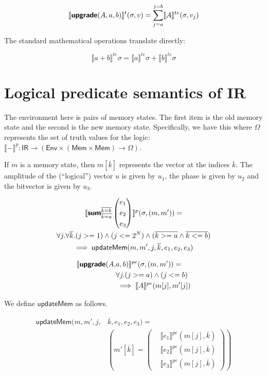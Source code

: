 \documentclass[runningheads]{llncs}
\newcommand {\ra} {\rightarrow}
\newcommand {\Env} {\textsf{Env}}
\newcommand {\sem} [1] {\llbracket #1 \rrbracket}
\newcommand {\Psem} [1] {\sem{#1}^p}
\newcommand {\PsemE} [1] {\sem{#1}^{pe}}
\newcommand {\Tsem} [1] {\sem{#1}^t}
\newcommand {\TsemE} [1] {\sem{#1}^{te}}
\newcommand {\Mem} {\textsf{Mem}}
\newcommand {\ir} [1] {\textsf{\textbf{#1}}}
\newcommand {\IRep} {\textsf{IR}}
\newcommand {\irUpgrade} {\ir{upgrade}}
\newcommand {\irSum} {\ir{sum}}
\newcommand {\updateMem} {\textsf{updateMem}}
\newcommand {\truthVals} {\Omega}
\begin{document}
\[
  \Tsem{\irUpgrade(A, a, b)}(\sigma, v) =
    \sum_{j=a}^{j=b} \TsemE{A}(\sigma, v_j)
\]

\noindent
The standard mathematical operations translate directly:

\[
  \TsemE{a + b}\sigma = \TsemE{a}\sigma + \TsemE{b}\sigma
\]

\section{Logical predicate semantics of IR}

The environment here is pairs of memory states. The first item is the old memory state and the second is the new memory state. Specifically, we have this where $\truthVals$ represents the set of truth values for the logic: $\Psem{-} : \IRep \ra (\Env \times (\Mem \times \Mem) \ra \truthVals)$.

If $m$ is a memory state, then $m[\overline{k}]$ represents the vector at the indices $\overline{k}$. The amplitude of the (``logical'') vector $u$ is given by $u_1$, the phase is given by $u_2$ and the bitvector is given by $u_3$.

\begin{multline*}
  \Psem{\irSum_{\overline{k=a}}^{\overline{k=b}}
    \left(\begin{aligned}
      &e_1\\
      &e_2\\
      &e_3
    \end{aligned}\right)}(\sigma, (m, m')) =\\
    \forall j. \forall \overline{k}. (j >= 1) \land (j <= 2^N) \land (\overline{k >= a} \land \overline{k <= b})\\
    \implies \updateMem(m, m', j, \overline{k}, e_1, e_2, e_3)
\end{multline*}

\[
\begin{aligned}
  \PsemE{\irUpgrade(A, &a, b)}(\sigma, (m, m')) =\\
    &\forall j. (j >= a) \land (j <= b)\\
      &\implies \PsemE{A}(m[j], m'[j])
\end{aligned}
\]

We define $\updateMem$ as follows.

\[
\begin{aligned}
  \updateMem(m, m', j, &\overline{k}, e_1, e_2, e_3) =\\
    &\left(m'[\overline{k}] = \left(\begin{aligned}
                          &\PsemE{e_1}(m[j], \overline{k})\\
                          &\PsemE{e_2}(m[j], \overline{k})\\
                          &\PsemE{e_3}(m[j], \overline{k})
    \end{aligned}\right)\right)
\end{aligned}
\]
\end{document}
